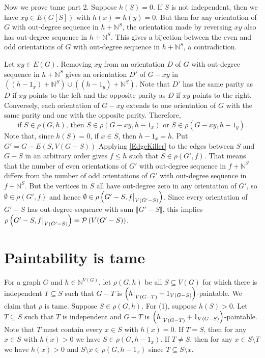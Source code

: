 \documentclass[12pt]{article}
\theoremstyle{plain}
\theoremstyle{definition}
\theoremstyle{remark}
\newcommand{\IN}{\mathbb{N}}
\newcommand{\size}[1]{\left\Vert#1\right\Vert}
\newcommand{\parens}[1]{\left( #1 \right)}
\newcommand\restr[2]{{%
  \left.\kern-\nulldelimiterspace %
  #1 %
  \vphantom{\big|} %
  \right|_{#2} %
  }}
\newcommand{\powset}[1]{\mathcal{P}\parens{#1}}
\begin{document}
Now we prove tame part 2. Suppose $h(S) = 0$.  If $S$ is not independent, then we have $xy \in E(G[S])$ with $h(x) = h(y) = 0$.  But then for any orientation of $G$ with out-degree sequence in $h + \IN^S$, the orientation made by reversing $xy$ also has out-degree sequence in $h + \IN^S$.  This gives a bijection between the even and odd orientations of $G$ with out-degree sequence in $h + \IN^S$, a contradiction.

Let $xy \in E(G)$.  Removing $xy$ from an orientation $D$ of $G$ with out-degree sequence in $h + \IN^S$ gives an orientation $D'$ of $G-xy$ in $((h - 1_x) + \IN^S) \cup ((h - 1_y) + \IN^S)$.  
Note that $D'$ has the same parity as $D$ if $xy$ points to the left and the opposite parity as $D$ if $xy$ points to the right.  
Conversely, each orientation of $G-xy$ extends to one orientation of $G$ with the same parity and one with the opposite parity.  
Therefore,
\begin{equation}\label{EdgeKiller}
\text{if } S \in \rho(G, h) \text{, then } S \in \rho(G-xy, h - 1_x) \text{ or } S \in \rho(G-xy, h - 1_y).
\end{equation}
Note that, since $h(S)=0$, if $x \in S$, then $h - 1_x = h$.
Put $G' = G - E(S, V(G-S))$ Applying \eqref{EdgeKiller} to the edges between $S$ and $G-S$ in an arbitrary order gives $f \le h$ such that $S \in \rho(G', f)$.
That means that the number of even orientations of $G'$ 
with out-degree sequence in $f + \IN^S$ differs from the number of odd orientations of $G'$ with out-degree sequence in $f + \IN^S$.  But
the vertices in $S$ all have out-degree zero in any orientation of $G'$, so $\emptyset \in \rho(G', f)$ and hence $\emptyset \in \rho\parens{G' - S, \restr{f}{V(G'-S)}}$.
Since every orientation of $G'-S$ has out-degree sequence with sum $\size{G'-S}$, this implies $\rho\parens{G' - S, \restr{f}{V(G'-S)}} = \powset{V(G'-S)}$.



\section{Paintability is tame}
For a graph $G$ and $h \in \IN^{V(G)}$, let $\rho(G,h)$ be all $S \subseteq V(G)$ for which there is independent $T \subseteq S$ such that $G-T$ is $\parens{\restr{h}{V(G-T)} + 1_{V(G-S)}}$-paintable.  We claim that $\rho$ is tame.  Suppose $S \in \rho(G,h)$. For (1), suppose $h(S)>0$.  Let $T \subseteq S$ such that $T$ is independent and $G-T$ is $\parens{\restr{h}{V(G-T)} + 1_{V(G-S)}}$-paintable.  Note that $T$ must contain every $x \in S$ with $h(x)=0$.  If $T=S$, then for any $x \in S$ with $h(x)>0$ we have $S \in \rho(G, h - 1_x)$.  If $T \ne S$, then for any $x \in S \setminus T$ we have $h(x) > 0$ and $S\setminus x \in \rho(G, h - 1_x)$ since $T \subseteq S\setminus x$.
\end{document}
